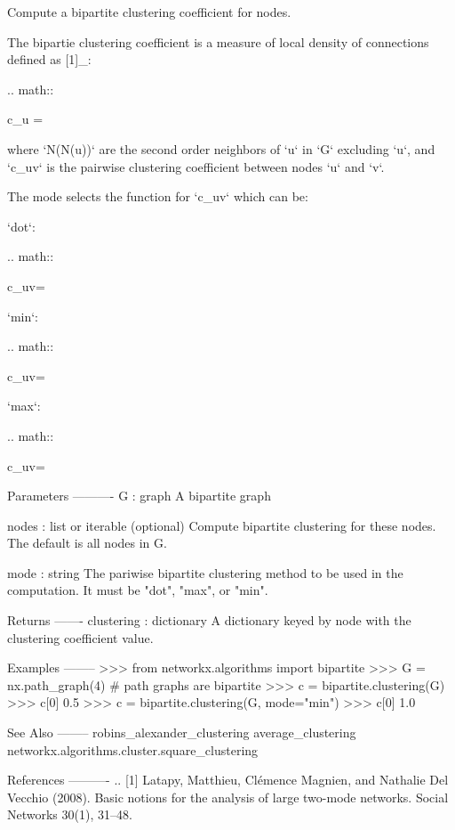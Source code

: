 \begin{DoxyVerb}Compute a bipartite clustering coefficient for nodes.

The bipartie clustering coefficient is a measure of local density
of connections defined as [1]_:

.. math::

   c_u = 

where `N(N(u))` are the second order neighbors of `u` in `G` excluding `u`,
and `c_{uv}` is the pairwise clustering coefficient between nodes
`u` and `v`.

The mode selects the function for `c_{uv}` which can be:

`dot`:

.. math::

   c_{uv}=

`min`:

.. math::

   c_{uv}=

`max`:

.. math::

   c_{uv}=


Parameters
----------
G : graph
    A bipartite graph

nodes : list or iterable (optional)
    Compute bipartite clustering for these nodes. The default
    is all nodes in G.

mode : string
    The pariwise bipartite clustering method to be used in the computation.
    It must be "dot", "max", or "min".

Returns
-------
clustering : dictionary
    A dictionary keyed by node with the clustering coefficient value.


Examples
--------
>>> from networkx.algorithms import bipartite
>>> G = nx.path_graph(4)  # path graphs are bipartite
>>> c = bipartite.clustering(G)
>>> c[0]
0.5
>>> c = bipartite.clustering(G, mode="min")
>>> c[0]
1.0

See Also
--------
robins_alexander_clustering
average_clustering
networkx.algorithms.cluster.square_clustering

References
----------
.. [1] Latapy, Matthieu, Clémence Magnien, and Nathalie Del Vecchio (2008).
   Basic notions for the analysis of large two-mode networks.
   Social Networks 30(1), 31--48.
\end{DoxyVerb}
 \mbox{\label{namespacenetworkx_1_1algorithms_1_1bipartite_1_1cluster_a360efe80c92355ee33929deeede41371}} 
